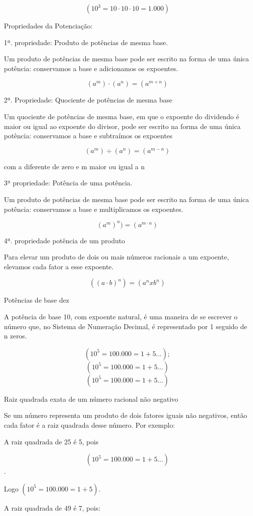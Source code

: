 $$(10^3 = 10 \cdot 10 \cdot 10 = 1.000)$$

Propriedades da Potenciação:

1ª. propriedade: Produto de potências de mesma base.

Um produto de potências de mesma base pode ser escrito na forma de uma
única potência: conservamos a base e adicionamos os expoentes.

$$(a^m) \cdot (a^n) = (a^{m+n})$$

2ª. Propriedade: Quociente de potências de mesma base

Um quociente de potências de mesma base, em que o expoente do dividendo
é maior ou igual ao expoente do divisor, pode ser escrito na forma de
uma única potência: conservamos a base e subtraímos os expoentes

$$(a^m) \div (a^n) = (a^{m-n})$$ 

com a diferente de zero e m maior ou
igual a n

3ª propriedade: Potência de uma potência.

Um produto de potências de mesma base pode ser escrito na forma de uma
única potência: conservamos a base e multiplicamos os expoentes.

$$(a^m)^n) = (a^{m \cdot n})$$

4ª. propriedade potência de um produto

Para elevar um produto de dois ou mais números racionais a um expoente,
elevamos cada fator a esse expoente.

$$((a \cdot b)^n)= (a^n x b^n)$$

Potências de base dez

A potência de base 10, com expoente natural, é uma maneira de se
escrever o número que, no Sistema de Numeração Decimal, é representado
por 1 seguido de n zeros.

$$(10^5 = 100.000 = 1 + 5...);$$
$$(10^5 = 100.000 = 1 + 5...)$$
$$(10^5 = 100.000 = 1 + 5...)$$

Raiz quadrada exata de um número racional não negativo

Se um número representa um produto de dois fatores iguais não negativos,
então cada fator é a raiz quadrada desse número. Por exemplo:

A raiz quadrada de 25 é 5, pois 

$$(10^5 = 100.000 = 1 + 5...)$$. 

Logo $(10^5 = 100.000 = 1 + 5)$.

A raiz quadrada de 49 é 7, pois:

